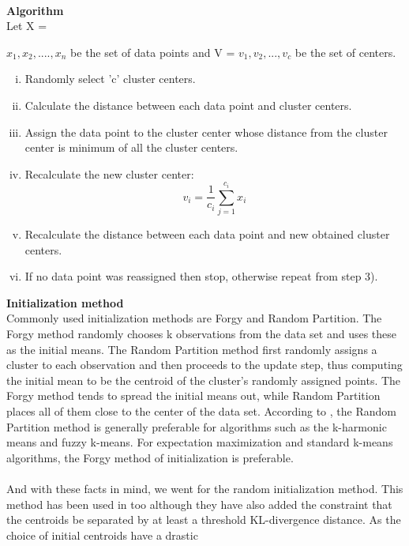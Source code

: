 \\
\textbf{Algorithm}\\
Let X = { $x_1, x_2,.... ,x_n$ be the set of data points and V = { $v_1,v_2 , ...,v_c$ } be the set of centers. 
        \begin{enumerate}[(i)]
                \item Randomly select 'c' cluster centers. 
                \item Calculate the distance between each data point and cluster centers. 
                \item Assign the data point to the cluster center whose distance from the cluster center is minimum of all the cluster centers. 
                \item Recalculate the new cluster center: 
                        \begin{equation}
                                v_i=\frac{1}{c_i}\sum_{j=1}^{c_i}{x_i}
                        \end{equation}
                \item  Recalculate the distance between each data point and new obtained cluster centers. 
                \item If no data point was reassigned then stop, otherwise repeat from step 3).
        \end{enumerate}
\textbf{Initialization method}\\
Commonly used initialization methods are Forgy and Random Partition. The Forgy method randomly chooses k observations from the data set and uses
these as the initial means. The Random Partition method first randomly assigns a cluster to each observation and then proceeds to the update step, thus
computing the initial mean to be the centroid of the cluster’s randomly assigned points. The Forgy method tends to spread the initial means out, while
Random Partition places all of them close to the center of the data set. According to \cite{Kour2015}, the Random Partition method is generally preferable for
algorithms such as the k-harmonic means and fuzzy k-means. For expectation maximization and standard k-means algorithms, the Forgy method of initialization is preferable.\\
\\
And with these facts in mind, we went for the random initialization method. This method has been used in \cite{muller2011} too although they have also added
the constraint that the centroids be separated by at least a threshold KL-divergence distance. As the choice of initial centroids have a drastic
}
